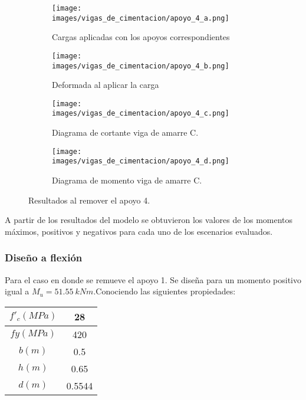 \documentclass[12pt]{article}
\begin{document}
\begin{figure}[H]
\begin{subfigure}{.5\textwidth}
  \centering
  \texttt{[image: images/vigas\_de\_cimentacion/apoyo\_4\_a.png]}  
  \caption{Cargas aplicadas con los apoyos correspondientes}
  \label{fig:Cargas removiendo AP4}
\end{subfigure}
\begin{subfigure}{.5\textwidth}
  \centering
  \texttt{[image: images/vigas\_de\_cimentacion/apoyo\_4\_b.png]}  
  \caption{Deformada al aplicar la carga}
  \label{fig:Deformada AP4}
\end{subfigure}

\begin{subfigure}{.5\textwidth}
  \centering
  \texttt{[image: images/vigas\_de\_cimentacion/apoyo\_4\_c.png]}  
  \caption{Diagrama de cortante viga de amarre C.}
  \label{fig:Cortante AP4}
\end{subfigure}
\begin{subfigure}{.5\textwidth}
  \centering
  \texttt{[image: images/vigas\_de\_cimentacion/apoyo\_4\_d.png]}  
  \caption{Diagrama de momento viga de amarre C.}
  \label{fig:Momento AP4}
\end{subfigure}
\caption{Resultados al remover el apoyo 4.}
\label{fig:R apoyo 4}
\end{figure}
A partir de los resultados del modelo se obtuvieron los valores de los momentos máximos, positivos y negativos para cada uno de los escenarios evaluados.
\subsubsection{Diseño a flexión}
Para el caso en donde se remueve el apoyo 1. Se diseña para un momento positivo igual a $M_{u}=51.55~kNm$.Conociendo las siguientes propiedades:

\begin{table}[htbp]
  \centering
    \begin{tabular}{|c|c|}
    \hline
    \textbf{$f'_{c} (MPa)$} & 28 \bigstrut\\
    \hline
    \textbf{$f{y} (MPa)$} & 420 \bigstrut\\
    \hline
    $b (m)$   & 0.5 \bigstrut\\
    \hline
    $h (m)$  & 0.65 \bigstrut\\
    \hline
    $d (m)$  & 0.5544 \bigstrut\\
    \hline
    \end{tabular}%
  \label{tab:addlabel}%
\end{table}%
\end{document}
